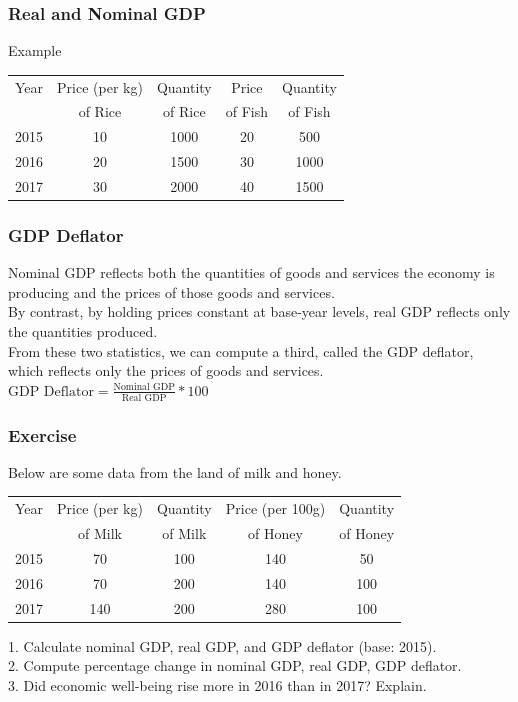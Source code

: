\documentclass[shownotes,11pt, aspectratio=169]{beamer}
\begin{document}
\begin{frame}
\frametitle{Real and Nominal GDP}
 Example
\\
\begin{center}
\begin{tabular}{ ccccc } 
 \hline
 Year & Price (per kg) & Quantity & Price  & Quantity \\
& of Rice & of Rice & of Fish & of Fish \\
\hline
2015 & 10 & 1000 & 20 & 500 \\
2016 & 20 & 1500 & 30 & 1000\\
2017 & 30 & 2000 & 40 & 1500\\
 \hline
\end{tabular}
\end{center}

\end{frame}

\begin{frame}
\frametitle{GDP Deflator}
Nominal GDP reflects both the quantities of goods and services
the economy is producing and the prices of those goods and services. \\
By contrast, by holding prices constant at base-year levels, real GDP reflects only the
quantities produced. \\


From these two statistics, we can compute a third, called the
GDP deflator, which reflects only the prices of goods and services. \\

$ \text{GDP Deflator} = \frac{\text{Nominal GDP}}{\text{Real GDP}}*100$
\end{frame}


\begin{frame}

\frametitle{Exercise}

Below are some data from the land of milk and honey. \\
\linespread{1}
\begin{center}
\begin{tabular}{ ccccc } 
 \hline
 Year & Price (per kg) & Quantity & Price (per 100g)  & Quantity \\
& of Milk & of Milk & of Honey & of Honey \\
\hline
2015 & 70 & 100 & 140 & 50 \\
2016 & 70 & 200 & 140 & 100 \\
2017 & 140 & 200 & 280 & 100 \\
 \hline
\end{tabular}
\end{center}
1. Calculate nominal GDP, real GDP, and GDP deflator (base: 2015). \\
2. Compute percentage change in nominal GDP, real GDP, GDP deflator. \\
3. Did economic well-being rise more in 2016 than in 2017? Explain.

\end{frame}
\end{document}
